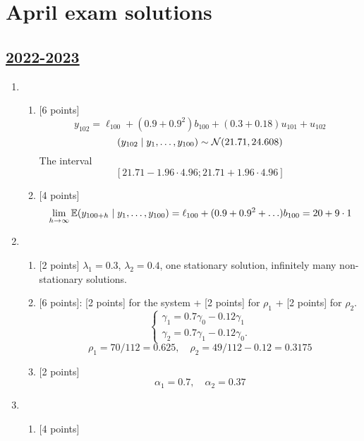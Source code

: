 
\newpage
\thispagestyle{empty}
\section{April exam solutions}
 

\subsection[2022-2023]{\hyperref[sec:kr_03_2022_2023]{2022-2023}}
\label{sec:sol_kr_03_2022_2023} %

\begin{enumerate}
    \item 
\begin{enumerate}
    \item {[6 points]}
    \[
        y_{102}= \ell_{100} + (0.9 + 0.9^2) b_{100} + (0.3 + 0.18)u_{101} + u_{102}    
        \]
        \[
        (y_{102} \mid y_1, \ldots, y_{100}) \sim \mathcal{N}(21.71, 24.608)    
        \]
        The interval
        \[
        [21.71 - 1.96 \cdot 4.96;21.71 + 1.96 \cdot 4.96]    
        \]
    \item {[4 points]}
    \[
    \lim_{h\to\infty} \operatorname{\mathbb{E}}(y_{100+h} \mid y_1, \ldots, y_{100}) = \ell_{100} + (0.9 + 0.9^2 +\ldots) b_{100} = 20 + 9\cdot 1    
    \]    
\end{enumerate}
\item 
\begin{enumerate}
    \item {[2 points]} $\lambda_1 = 0.3$, $\lambda_2 = 0.4$, one stationary solution, infinitely many non-stationary solutions. 
    \item {[6 points]}: {[2 points] for the system} + {[2 points] for $\rho_1$} + {[2 points] for $\rho_2$}.
    \[
        \begin{cases}
            \gamma_1 = 0.7 \gamma_0  - 0.12 \gamma_1 \\
            \gamma_2 = 0.7 \gamma_1 - 0.12 \gamma_0. 
        \end{cases}
    \]
    \[
    \rho_1 = 70/112 = 0.625, \quad \rho_2 = 49/112 - 0.12 = 0.3175    
    \]
    \item {[2 points]}
    \[
    \alpha_1 = 0.7, \quad \alpha_2 = 0.37    
    \]
\end{enumerate}
\item 
\begin{enumerate}
    \item {[4 points]}
    \[
\]
\end{enumerate}
\end{enumerate}
